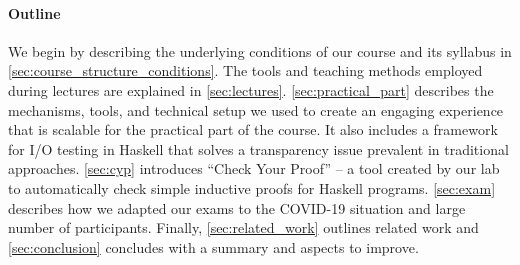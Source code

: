 \paragraph{Outline}

We begin by describing the underlying conditions of our course and its syllabus in \cref{sec:course_structure_conditions}.
The tools and teaching methods employed during lectures are explained in \cref{sec:lectures}.
\cref{sec:practical_part} describes the
mechanisms, tools, and technical setup
we used to create an engaging experience
that is scalable
for the practical part of the course.
It also includes a framework for I/O
testing in Haskell
that solves a transparency issue prevalent in traditional approaches.
\cref{sec:cyp} introduces
``Check Your Proof'' -- a tool created
by our lab to automatically check simple inductive proofs for Haskell programs.
\cref{sec:exam} describes how we adapted our exams to the COVID-19 situation and large number of participants.
Finally, \cref{sec:related_work} outlines related work
and \cref{sec:conclusion} concludes with a summary and aspects to improve.

